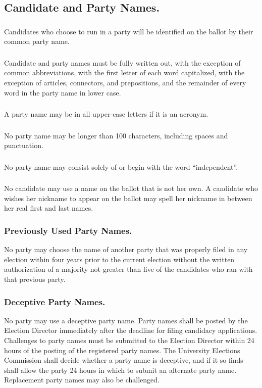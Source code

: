 \subsection{Candidate and Party Names.}
\subsubsection{}
Candidates who choose to run in a party will be identified on the ballot by their common party name.
\subsubsection{}
Candidate and party names must be fully written out, with the exception of common abbreviations, with the first letter of each word capitalized, with the exception of articles, connectors, and prepositions, and the remainder of every word in the party name in lower case.
\subsubsection{}
A party name may be in all upper-case letters if it is an acronym.
\subsubsection{}
No party name may be longer than 100 characters, including spaces and punctuation.
\subsubsection{}
No party name may consist solely of or begin with the word ``independent''.
\subsubsection{}
No candidate may use a name on the ballot that is not her own.  A candidate who wishes her nickname to appear on the ballot may spell her nickname in between her real first and last names.
\subsubsection{Previously Used Party Names.}
No party may choose the name of another party that was properly filed in any election within four years prior to the current election without the written authorization of a majority not greater than five of the candidates who ran with that previous party.
\subsubsection{Deceptive Party Names.}
No party may use a deceptive party name.
\subsubsubsection{}
Party names shall be posted by the Election Director immediately after the deadline for filing candidacy applications.  
\subsubsubsection{}
Challenges to party names must be submitted to the Election Director within 24 hours of the posting of the registered party names.
\subsubsubsection{}
The University Elections Commission shall decide whether a party name is deceptive, and if it so finds shall allow the party 24 hours in which to submit an alternate party name.
\subsubsubsection{}
Replacement party names may also be challenged.
